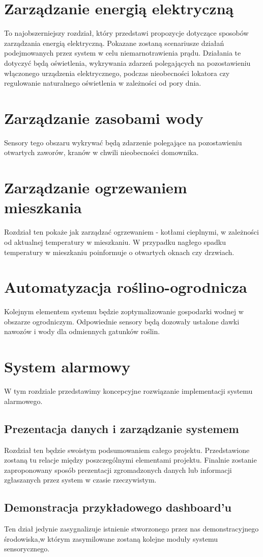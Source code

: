\documentclass[12pt]{article} %
\begin{document}
\section{Zarządzanie energią elektryczną}
To najobszerniejszy rozdział, który przedstawi propozycje dotyczące sposobów zarządzania energią elektryczną. Pokazane zostaną scenariusze działań podejmowanych przez system w celu niemarnotrawienia prądu. Działania te dotyczyć będą oświetlenia, wykrywania zdarzeń polegających na pozostawieniu   włączonego urządzenia elektrycznego, podczas nieobecności lokatora czy regulowanie naturalnego oświetlenia w zależności od pory dnia.

\section{Zarządzanie zasobami wody}
Sensory tego obszaru wykrywać będą zdarzenie polegające na pozostawieniu otwartych zaworów, kranów w chwili nieobecności domownika.

\section{Zarządzanie ogrzewaniem mieszkania}
Rozdział ten pokaże jak zarządzać ogrzewaniem - kotłami cieplnymi, w zależności od aktualnej temperatury w mieszkaniu. W przypadku nagłego spadku temperatury w mieszkaniu poinformuje o otwartych oknach czy drzwiach.

\section{Automatyzacja roślino-ogrodnicza}
Kolejnym elementem systemu będzie zoptymalizowanie gospodarki wodnej w obszarze ogrodniczym. Odpowiednie sensory będą dozowały ustalone dawki nawozów i wody dla odmiennych gatunków roślin.

\section{System alarmowy}
W tym rozdziale przedstawimy koncepcyjne rozwiązanie implementacji systemu alarmowego.

\subsection{Prezentacja danych i zarządzanie systemem}
Rozdział ten będzie swoistym podsumowaniem całego projektu. Przedstawione zostaną tu relacje między poszczególnymi elementami projektu. Finalnie zostanie zaproponowany sposób prezentacji zgromadzonych danych lub informacji zgłaszanych przez system w czasie rzeczywistym.

\subsection{Demonstracja przykładowego dashboard'u}
Ten dział jedynie zasygnalizuje istnienie stworzonego przez nas demonstracyjnego środowiska,w którym zasymilowane zostaną kolejne moduły systemu sensorycznego.
\end{document}
